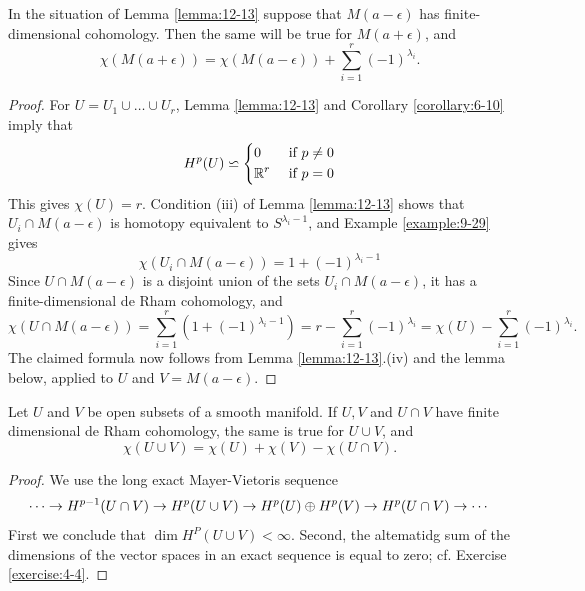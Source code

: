 \begin{proposition}\label{proposition:12-14}
  In the situation of Lemma \ref{lemma:12-13} suppose that $M(a-\epsilon)$ has
  finite-dimensional cohomology. Then the same will be true for $M(a + \epsilon)$, and
  \[
    \chi(M(a+\epsilon)) = \chi(M(a-\epsilon)) + \sum_{i=1}^{r}{(-1)^{\lambda_i}}.
  \]
\end{proposition}

\begin{proof}
  For $U=U_1\cup\ldots\cup U_r$, Lemma \ref{lemma:12-13} and Corollary \ref{corollary:6-10} imply that 
  \begin{align*}
    H^p(U) \backsimeq \left\{\begin{aligned}
      &0 && \text{ if } p\neq 0 \\
      &{\mathbb{R}}^r && \text{ if } p = 0
    \end{aligned}\right.
  \end{align*}
  This gives $\chi(U) = r$. Condition (iii) of Lemma \ref{lemma:12-13} shows that $U_i\cap M(a-\epsilon)$
  is homotopy equivalent to $S^{\lambda_i-1}$, and Example \ref{example:9-29} gives
  \[
    \chi(U_i\cap M(a-\epsilon)) 
    = 1 + (-1)^{\lambda_i - 1}
  \]
  Since $U\cap M(a-\epsilon)$ is a disjoint union of the sets $U_i\cap M(a-\epsilon)$, it has a
  finite-dimensional de Rham cohomology, and 
  \[
    \chi(U\cap M(a-\epsilon)) 
    = \sum_{i=1 }^{r }{(1+(-1)^{\lambda_i-1})}
    = r - \sum_{i=1 }^{r }{(-1)^{\lambda_i}}
    = \chi(U) - \sum_{i=1 }^{r }{(-1)^{\lambda_i}}.
  \]
  The claimed formula now follows from Lemma \ref{lemma:12-13}.(iv) and the lemma below,
  applied to $U$ and $V = M(a - \epsilon)$.
\end{proof}

\begin{lemma}\label{lemma:12-15}
  Let $U$ and $V$ be open subsets of a smooth manifold. If $U, V$ and
$U\cap V$ have finite dimensional de Rham cohomology, the same is true for $U\cup V$, and
\[
  \chi(U\cup V) = \chi(U) + \chi(V) - \chi(U\cap V).
\]
\end{lemma}

\begin{proof}
  We use the long exact Mayer-Vietoris sequence
  \[
    \cdots\rightarrow H^{p-1}(U\cap V)\rightarrow H^p(U\cup V)\rightarrow H^p(U)\oplus H^p(V)\rightarrow H^p(U\cap V)\rightarrow\cdots
  \]
  First we conclude that $\dim H^P(U\cup V)<\infty$. Second, the altematidg sum of the
  dimensions of the vector spaces in an exact sequence is equal to zero; cf. Exercise \ref{exercise:4-4}.
\end{proof}

